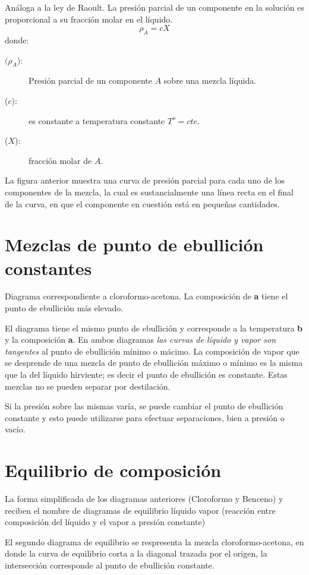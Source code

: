 \documentclass[11pt,openany]{book}
\begin{document}
Análoga a la ley de Raoult. La presión parcial de un componente en la solución es proporcional a su 
fracción molar en el líquido.
\begin{equation}
\boxed{\rho_A=c X}
\end{equation}
donde:
\begin{description}
\item [$(\rho_A$):] Presión parcial de un componente $A$ sobre una mezcla líquida.
\item [($c$):] es constante a temperatura constante $T^o=cte.$
\item [($X$):] fracción molar de $A$.
\end{description}
La figura anterior muestra una curva de presión parcial para cada uno de los componentes de la 
mezcla, la cual es sustancialmente una línea recta en el final de la curva, en que el componente en 
cuestión está en pequeñas cantidades.

\section{Mezclas de punto de ebullición constantes}

Diagrama correspondiente a cloroformo-acetona. La composición de \textbf{a} tiene el punto de ebullición más elevado.

El diagrama tiene el mismo punto de ebullición y corresponde a la temperatura \textbf{b} y la composición \textbf{a}.
En ambos diagramas \textit{las curvas de líquido y vapor son tangentes} al punto de ebullición mínimo o mácimo.
La composición de vapor que se desprende de una mezcla de punto de ebullición máximo o mínimo es la misma que la del líquido
hirviente; es decir el punto de ebullición es constante.
Estas mezclas no se pueden separar por destilación.

Si la presión sobre las mismas varía, se puede cambiar el punto de ebullición constante y esto puede utilizarse para 
efectuar separaciones, bien a presión o vacío.

\section{Equilibrio de composición}

La forma simplificada de los diagramas anteriores (Cloroformo y Benceno) y reciben el nombre de diagramas de equilibrio 
líquido vapor (reacción entre composición del líquido y el vapor a presión constante)

El segundo diagrama de equilibrio se respresenta la mezcla cloroformo-acetona, en donde la curva de equilibrio corta a la 
diagonal trazada por el origen, la intersección corresponde al punto de ebullición constante.
\end{document}
